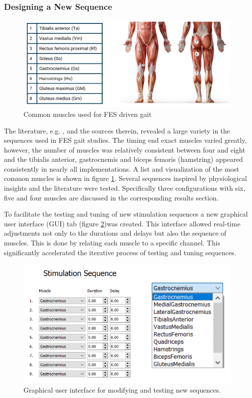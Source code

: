 \subsubsection{Designing a New Sequence}
\begin{figure} [h]
    \centering
    \includegraphics[width=0.85\linewidth]{images/common_muscles.png}
    \caption{Common muscles used for FES driven gait}
    \label{fig:commonMuscles}
\end{figure}

The literature, e.g. \cite{aout_effects_2023}, \cite{chaikho_transcutaneous_2022} and the sources therein, revealed a large variety in the sequences used in FES gait studies. The timing end exact muscles varied greatly, however, the number of muscles was relatively consistent between four and eight and the tibialis anterior, gastrocnemis and biceps femoris (hamstring) appeared consistently in nearly all implementations. A list and visualization of the most common muscles is shown in figure \ref{fig:commonMuscles}. Several sequences inspired by physiological insights and the literature were tested. Specifically three configurations with six, five and four muscles are discussed in the corresponding results section. 

To facilitate the testing and tuning of new stimulation sequences a new graphical user interface (GUI) tab (figure \ref{fig:sequenceGUI})was created. This interface allowed real-time adjustments not only to the durations and delays but also the sequence of muscles. This is done by relating each muscle to a specific channel. This significantly accelerated the iterative process of testing and tuning sequences. 

\begin{figure} [h]
    \centering
    \includegraphics[width=0.8\linewidth]{images/sequenceGUI.png}
    \caption{Graphical user interface for modifying and testing new sequences.}
    \label{fig:sequenceGUI}
\end{figure}

